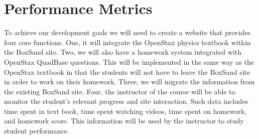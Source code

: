 \documentclass[onecolumn, draftclsnofoot,10pt, compsoc]{IEEEtran}
\begin{document}
\section{Performance Metrics}	
To achieve our development goals we will need to create a website that provides four core functions. One, it will integrate the OpenStax physics textbook within the BoxSand site. Two, we will also have a homework system integrated with OpenStax QuadBase questions. This will be implemented in the same way as the OpenStax textbook in that the students will not have to leave the BoxSand site in order to work on their homework. Three, we will migrate the information from the existing BoxSand site. Four, the instructor of the course will be able to monitor the student’s relevant progress and site interaction. Such data includes time spent in text book, time spent watching videos, time spent on homework, and homework score. This information will be used by the instructor to study student performance.
\end{document}
